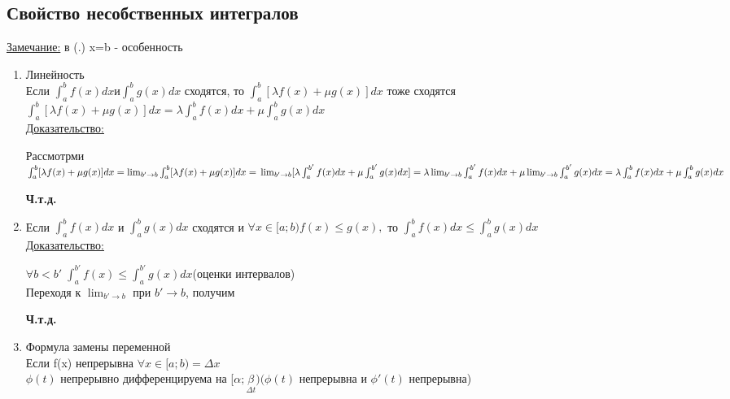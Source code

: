 \documentclass[12pt]{article}
\begin{document}
    \subsection{Свойство несобственных интегралов}
    \underline{Замечание:} в (.) x=b - особенность
    \begin{enumerate}
        \item Линейность\\
        Если $\int_{a}^{b}f(x)dx и \int_{a}^{b} g(x)dx$ сходятся, то $\int_{a}^{b} [\lambda f(x)+\mu g(x)]dx$ тоже сходятся\\
        $\int_{a}^{b}[\lambda f(x)+\mu g(x)]dx=\lambda \int_{a}^{b} f(x)dx + \mu \int_{a}^{b}g(x)dx$\\
        \underline{Доказательство:}
        \begin{adjustwidth}{1.5em}{1.5em}
            Рассмотрми $\int_{a}^{b}[\lambda f(x)+\mu g(x)]dx=\lim_{b' \to b} \int_{a}^{b}[\lambda f(x)+\mu g(x)]dx= \\ \lim_{b' \to b}[\lambda \int_{a}^{b'}f(x)dx+\mu \int_{a}^{b'}g(x)dx]=
            \lambda\lim_{b' \to b} \int_{a}^{b'}f(x)dx+\mu\lim_{b' \to b}\int_{a}^{b'}g(x)dx=\\ \lambda \int_{a}^{b}f(x)dx+\mu \int_{a}^{b}g(x)dx$
            \begin{center}
                \textbf{Ч.т.д.}
            \end{center}
        \end{adjustwidth}
        \item Если $\int_{a}^{b} f(x)dx$ и $\int_{a}^{b} g(x)dx$ сходятся и $\forall x \in [a;b) f(x) \leq g(x), $ то $\int_{a}^{b}f(x)dx \leq \int_{a}^{b}g(x)dx$\\
        \underline{Доказательство:}
        \begin{adjustwidth}{1.5em}{1.5em}
            $\forall b<b' \; \int_{a}^{b'} f(x) \leq \int_{a}^{b'} g(x)dx$(оценки интервалов)\\
            Переходя к $\lim_{b' \to b}$ при $b' \to b$, получим
            \begin{center}
                \textbf{Ч.т.д.}
            \end{center}
        \end{adjustwidth}
        \item Формула замены переменной\\
        Если f(x) непрерывна $\forall x \in [a;b) = \Delta x$\\
        $\phi(t)$ непрерывно дифференцируема на [$\alpha;\underset{\Delta t}{\beta})(\phi(t)$ непрерывна и $\phi'(t)$ непрерывна)\\

\end{enumerate}
\end{document}
